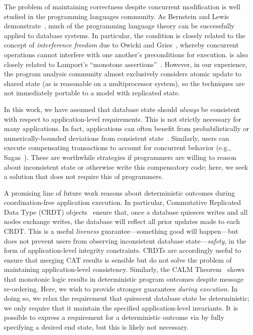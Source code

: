  The problem of maintaining correctness
despite concurrent modification is well studied in the programming
languages community. As Bernstein and Lewis
demonstrate~\cite{decomp-semantics}, much of the programming language
theory can be successfully applied to database systems. In particular,
the \cfreedom condition is closely related to the concept of
\textit{interference freedom} due to Owicki and
Gries~\cite{owickigries}, whereby concurrent operations cannot
interfere with one another's preconditions for execution. \iconfluence
is also closely related to Lamport's ``monotone
assertions''~\cite{lamport-correctness}. However, in our experience,
the program analysis community almost exclusively considers atomic
update to shared state (as is reasonable on a multiprocessor system),
so the techniques are not immediately portable to a model with
replicated state.

 In this work, we have assumed that
database state should \textit{always} be consistent with respect to
application-level requirements. This is not strictly necessary for
many applications. In fact, applications can often benefit from
probabilistically or numerically-bounded deviations from consistent
state~\cite{epsilon-divergence}. Similarly, users can execute
compensating transactions to account for concurrent behavior (e.g.,
Sagas~\cite{sagas}). These are worthwhile strategies if programmers
are willing to reason about inconsistent state or otherwise write this
compensatory code; here, we seek a solution that does not require this
of programmers.

 A promising line of future work
reasons about deterministic outcomes during coordination-free
application execution. In particular, Commutative Replicated Data Type
(CRDT) objects~\cite{crdt} ensure that, once a database quiesces
writes and all nodes exchange writes, the database will reflect all
prior updates made to each CRDT. This is a useful \textit{liveness}
guarantee---something good will happen---but does not prevent users
from observing inconsistent database state---\textit{safety}, in the
form of application-level integrity constraints. CRDTs are accordingly
useful to ensure that merging CAT results is sensible but do not solve
the problem of maintaining application-level consistency. Similarly,
the CALM Theorem~\cite{calm} shows that monotonic logic results in
deterministic program outcomes despite message re-ordering. Here, we
wish to provide stronger guarantees \textit{during execution}. In
doing so, we relax the requirement that quiescent database state be
deterministic; we only require that it maintain the specified
application-level invariants. It is possible to express a requirement
for a deterministic outcome via \iconfluence by fully specifying a
desired end state, but this is likely not necessary.

